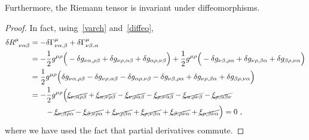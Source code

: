    Furthermore, the Riemann tensor is invariant under diffeomorphisms.
    \begin{proof}
        In fact, using~\eqref{varch} and~\eqref{diffeo},
        \begin{equation*}
        \begin{aligned}
            \delta R^{\mu}_{\phantom \mu \nu\alpha\beta} & = - \delta \Gamma^\mu_{\nu\alpha,\beta} + \delta \Gamma^\mu_{\nu\beta,\alpha} \\ & = - \frac{1}{2} g^{\mu\rho} \Big (-\delta g_{\nu\alpha, \rho\beta} + \delta g_{\nu\rho,\alpha\beta} + \delta g_{\alpha\rho,\nu\beta} \Big) + \frac{1}{2} g^{\mu\rho}  \Big ( -\delta g_{\nu\beta, \rho\alpha} + \delta g_{\nu\rho,\beta\alpha} + \delta g_{\beta\rho,\nu\alpha} \Big) \\ & = \frac{1}{2} g^{\mu\rho} \Big (\delta g_{\nu\alpha, \rho\beta} - \delta g_{\nu\rho,\alpha\beta} - \delta g_{\alpha\rho,\nu\beta} -\delta g_{\nu\beta, \rho\alpha} + \delta g_{\nu\rho,\beta\alpha} + \delta g_{\beta\rho,\nu\alpha} \Big) \\ & = - \frac{1}{2} g^{\mu\rho} \Big (\cancel{\xi_{\nu,\alpha\rho\beta}} + \cancel{\xi_{\alpha,\nu\rho\beta}} - \cancel{\xi_{\nu,\rho\alpha\beta}} - \cancel{\xi_{\rho,\nu\alpha\beta}} - \cancel{\xi_{\alpha,\rho\nu\beta}} - \cancel{\xi_{\rho,\alpha\beta\nu}} \\ & \qquad - \cancel{\xi_{\nu,\beta\rho\alpha}} - \cancel{\xi_{\beta,\nu\rho\alpha}} + \cancel{\xi_{\nu,\rho\beta\alpha}} + \cancel{\xi_{\rho,\nu\beta\alpha}} + \cancel{\xi_{\beta,\rho\nu\alpha}} + \cancel{\xi_{\rho,\beta\nu\alpha}} \Big) = 0 ~,
        \end{aligned}
        \end{equation*}
        where we have used the fact that partial derivatives commute.
    \end{proof}
    